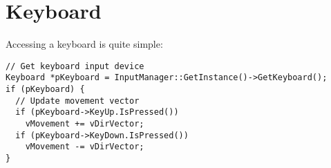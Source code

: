 \chapter{Keyboard}
Accessing a keyboard is quite simple:

\begin{lstlisting}[caption=Keyboard usage example]
// Get keyboard input device
Keyboard *pKeyboard = InputManager::GetInstance()->GetKeyboard();
if (pKeyboard) {
  // Update movement vector
  if (pKeyboard->KeyUp.IsPressed())
    vMovement += vDirVector;
  if (pKeyboard->KeyDown.IsPressed())
    vMovement -= vDirVector;
}
\end{lstlisting}
